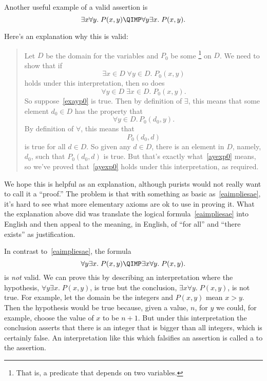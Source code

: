 Another useful example of a valid assertion is
\begin{equation}\label{eaimpliesae}
\exists x \forall y.\; P(x,y) \QIMP \forall y \exists x.\; P(x,y).
\end{equation}

Here's an explanation why this is valid:

\begin{quote}
Let $D$ be the domain for the variables and $P_0$ be some
\footnote{That is, a predicate that depends on two variables.}
on $D$.  We need to show that if
\begin{equation}\label{exayp0}
\exists x \in D\; \forall y \in D.\; P_0(x,y)
\end{equation}
holds under this interpretation, then so does
\begin{equation}\label{ayexp0}
\forall y \in D\; \exists x \in D.\; P_0(x,y).
\end{equation}
So suppose~\eqref{exayp0} is true.  Then by definition of $\exists$, this
means that some element $d_0 \in D$ has the property that
\[
\forall y \in D.\, P_0(d_0, y).
\]
By definition of $\forall$, this means that
\[
P_0(d_0,d)
\]
is true for all $d \in D$.  So given any $d \in D$, there is an element in
$D$, namely, $d_0$, such that $P_0(d_0,d)$ is true.  But that's exactly
what~\eqref{ayexp0} means, so we've proved that~\eqref{ayexp0} holds under
this interpretation, as required.
\end{quote}

We hope this is helpful as an explanation, although purists would not
really want to call it a ``proof.''  The problem is that with something as basic
as~\eqref{eaimpliesae}, it's hard to see what more elementary axioms are
ok to use in proving it.  What the explanation above did was translate the
logical formula~\eqref{eaimpliesae} into English and then appeal to the
meaning, in English, of ``for all'' and ``there exists'' as justification.

In contrast to~\eqref{eaimpliesae}, the formula
\begin{equation}\label{aenotimplyea}
\forall y \exists x.\; P(x,y) \QIMP \exists x \forall y.\; P(x,y).
\end{equation}
is \emph{not} valid.  We can prove this by describing an
interpretation where the hypothesis, $\forall y \exists x.\; P(x,y)$, is
true but the conclusion, $\exists x \forall y.\; P(x,y)$, is not true.
For example, let the domain be the integers and $P(x,y)$ mean $x > y$.
Then the hypothesis would be true because, given a value, $n$, for $y$ we
could, for example, choose the value of $x$ to be $n+1$.  But under this
interpretation the conclusion asserts that there is an integer that is
bigger than all integers, which is certainly false.  An interpretation
like this which falsifies an assertion is called a  to
the assertion.

